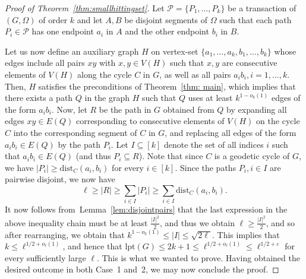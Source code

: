 \documentclass[11pt,reqno]{article}
\begin{document}
\begin{proof}[Proof of Theorem~\ref{thm:smallhittingset}]
Let $\mathcal{P}=\{P_1,\ldots,P_k\}$ be a transaction of $(G,\Omega)$ of order $k$ and let $A, B$ be disjoint segments of $\Omega$ such that each path $P_i\in \mathcal{P}$ has one endpoint $a_i$ in $A$ and the other endpoint $b_i$ in $B$.

Let us now define an auxiliary graph $H$ on vertex-set $\{a_1,\ldots,a_k,b_1,\ldots,b_k\}$ whose edges include all pairs $xy$ with $x,y\in V(H)$ such that $x,y$ are consecutive elements of $V(H)$ along the cycle $C$ in $G$, as well as all pairs $a_ib_i, i=1,\ldots,k$. Then, $H$ satisfies the preconditions of Theorem~\ref{thm: main}, which implies that there exists a path $Q$ in the graph $H$ such that $Q$ uses at least $k^{1-o_k(1)}$ edges of the form $a_ib_i$. Now, let $R$ be the path in $G$ obtained from $Q$ by expanding all edges $xy\in E(Q)$ corresponding to consecutive elements of $V(H)$ on the cycle $C$ into the corresponding segment of $C$ in $G$, and replacing all edges of the form $a_ib_i\in E(Q)$ by the path $P_i$. Let $I\subseteq [k]$ denote the set of all indices $i$ such that $a_ib_i\in E(Q)$ (and thus $P_i\subseteq R$). Note that since $C$ is a geodetic cycle of $G$, we have $|P_i|\ge \mathrm{dist}_C(a_i,b_i)$ for every $i\in [k]$. Since the paths $P_i, i\in I$ are pairwise disjoint, we now have
$$\ell\ge |R|\ge \sum_{i\in I}|P_i|\ge \sum_{i\in I}\mathrm{dist}_C(a_i,b_i).$$
It now follows from~Lemma~\ref{lem:disjointpairs} that the last expression in the above inequality chain must be at least $\frac{|I|^2}{2}$, and thus we obtain $\ell\ge \frac{|I|^2}{2}$, and so after rearranging, we obtain that $k^{1-o_k(1)}\le |I|\le \sqrt{2\ell}$. This implies that $k\le \ell^{1/2+o_\ell(1)}$, and hence that $\mathrm{lpt}(G)\le 2k+1\le \ell^{1/2+o_\ell(1)}\le \ell^{1/2+\varepsilon}$ for every sufficiently large $\ell$. This is what we wanted to prove. Having obtained the desired outcome in both Case~1 and~2, we may now conclude the proof.
\end{proof}
\end{document}
